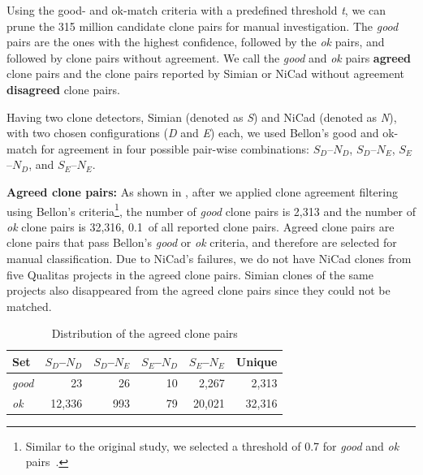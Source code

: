 \documentclass[sigconf,review, anonymous]{acmart}
\begin{document}
Using the good- and ok-match criteria with a predefined threshold
\textit{t}, we can prune the 315 million candidate clone pairs for
manual investigation. The \textit{good} pairs are the ones with the
highest confidence, followed by the \textit{ok} pairs, and followed by
clone pairs without agreement. We call the \textit{good} and
\textit{ok} pairs \textbf{agreed} clone pairs and the clone pairs
reported by Simian or NiCad without agreement \textbf{disagreed} clone
pairs.

Having two clone detectors, Simian (denoted as \textit{S}) and NiCad
(denoted as \textit{N}), with two chosen configurations (\textit{D}
and \textit{E}) each, we used Bellon's good and ok-match for agreement
in four possible pair-wise combinations: $S_{D}$--$N_{D}$,
$S_{D}$--$N_{E}$, $S_{E}$--$N_{D}$, and $S_{E}$--$N_{E}$.

\textbf{Agreed clone pairs: } As shown in , after we applied clone
agreement filtering using Bellon's criteria\footnote{Similar to the
  original study, we selected a threshold of 0.7 for
  \textit{good} and \textit{ok} pairs~\cite{Bellon2007}.}, the number
of \textit{good} clone pairs is 2,313 and the number of \textit{ok}
clone pairs is 32,316, 0.1\textperthousand~of all reported clone
pairs.  Agreed clone pairs are clone pairs that pass Bellon's
\textit{good} or \textit{ok} criteria, and therefore are selected for
manual classification.  Due to NiCad's failures, we do not have NiCad
clones from five Qualitas projects in the agreed clone pairs. Simian
clones of the same projects also disappeared from the agreed clone
pairs since they could not be matched.

\begin{table}
  \centering
  \caption{Distribution of the agreed clone pairs}
  \label{t_agreed_good_clone_pairs}
  \begin{tabular}{l|r|r|r|r|r}
    \hline
    Set & $S_D$--$N_D$ & $S_D$--$N_E$ & $S_E$--$N_D$ & $S_E$--$N_E$ & Unique \\
    \hline
    \textit{good} & 23 & 26 & 10 & 2,267 & 2,313 \\
    \textit{ok} & 12,336 & 993 & 79 & 20,021 & 32,316 \\
    \hline
  \end{tabular} %
\end{table}
\end{document}
